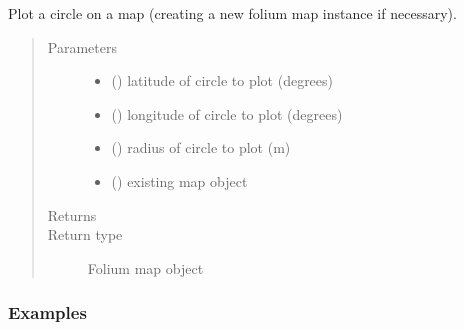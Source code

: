 \documentclass[letterpaper,10pt,english]{sphinxmanual}
\begin{document}
\begin{fulllineitems}
\label{\detokenize{index:flood_tool.plot_circle}}
\sphinxAtStartPar
Plot a circle on a map (creating a new folium map instance if necessary).
\begin{quote}\begin{description}
\item[{Parameters}] \leavevmode\begin{itemize}
\item {} 
\sphinxAtStartPar
{} () \textendash{} latitude of circle to plot (degrees)

\item {} 
\sphinxAtStartPar
{} () \textendash{} longitude of circle to plot (degrees)

\item {} 
\sphinxAtStartPar
{} () \textendash{} radius of circle to plot (m)

\item {} 
\sphinxAtStartPar
{} () \textendash{} existing map object

\end{itemize}

\item[{Returns}] \leavevmode
\sphinxAtStartPar


\item[{Return type}] \leavevmode
\sphinxAtStartPar
Folium map object

\end{description}\end{quote}
\subsubsection*{Examples}

\begin{sphinxVerbatim}[commandchars=\\\{\}]
 
   
\end{sphinxVerbatim}

\end{fulllineitems}
\end{document}
